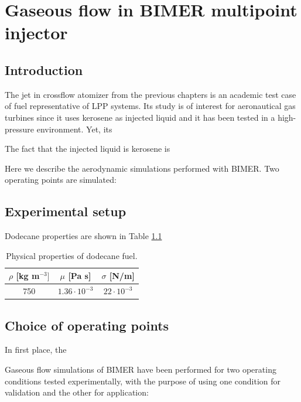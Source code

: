 \chapter{Gaseous flow in BIMER multipoint injector}
	\label{ch9:bimer_test_bench_and_aero}

\section{Introduction}

The jet in crossflow atomizer from the previous chapters is an academic test case of fuel representative of LPP systems. Its study is of interest for aeronautical gas turbines since it uses kerosene as injected liquid and it has been tested in a high-pressure environment. Yet, its

The fact that the injected liquid is kerosene is 

Here we describe the aerodynamic simulations performed with BIMER. Two operating points are simulated:



\section{Experimental setup}

Dodecane properties are shown in Table \ref{tab:dodecane_properties}

\begin{table}[!h]
\centering
\caption{Physical properties of dodecane fuel.}
\begin{tabular}{|c|c|c|}
\hline
$\rho$ [kg m$^{-3}]$   & $\mu$ [Pa s]   & $\sigma$ [N/m]  \\
\hline
750 & $1.36 \cdot 10^{-3}$ & $22 \cdot 10^{-3}$ \\
\hline
\end{tabular}
\label{tab:dodecane_properties}
\end{table}


\section{Choice of operating points}

In first place, the 

Gaseous flow simulations of BIMER have been performed for two operating conditions tested experimentally, with the purpose of using one condition for validation and the other for application:

